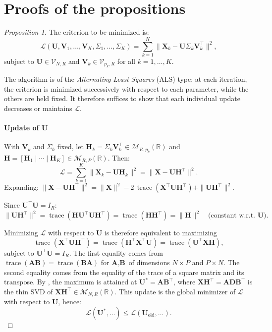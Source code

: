 \documentclass[11pt]{article}
\DeclareMathOperator{\trace}{\mathrm{trace}}
\newcommand{\X}{\mathbf{X}}
\newcommand{\U}{\mathbf{U}}
\newcommand{\V}{\mathbf{V}}
\newcommand{\HH}{\mathbf{H}}
\newcommand{\Stiefel}[2]{\mathcal V_{#1,#2}}
\begin{document}
\clearpage







\appendix
\section{Proofs of the propositions}

\begin{proof}[Proposition 1]
	The criterion to be minimized is:
\[
  \mathcal{L}(\U, \V_1, \ldots, \V_K, \Sigma_1, \ldots, \Sigma_K)
  = \sum_{k=1}^{K} \bigl\| \X_k - \U \Sigma_k \V_k^\top \bigr\|^2,
\]
subject to $\U\in\Stiefel{N}{R}$ and $\V_k\in \Stiefel{p_k}{R}$ for all $k = 1, \ldots, K$.

The algorithm is of the \emph{Alternating Least Squares} (ALS) type: at each iteration, the criterion is minimized successively with respect to each parameter, while the others are held fixed. It therefore suffices to show that each individual update decreases or maintains $\mathcal{L}$.

\paragraph{Update of $\U$} With $\V_k$ and $\Sigma_k$ fixed, let $\HH_k = \Sigma_k \V_k^\intercal \in \mathcal{M}_{R,p_k}(\mathbb{R})$ and
$\HH = [\HH_1 \mid \cdots \mid \HH_K] \in \mathcal{M}_{R,P}(\mathbb{R})$. Then:
\[
  \mathcal{L} = \sum_{k=1}^{K} \|\X_k - \U \HH_k\|^2 = \|\X - \U \HH^\intercal\|^2.
\]
Expanding:
$\|\X - \U \HH^\intercal\|^2
  = \|\X\|^2 - 2\,\operatorname{trace}(\X^\intercal \U \HH^\intercal) + \|\U \HH^\intercal\|^2.$

\noindent Since $\U^\intercal \U = I_R$: $\|\U \HH^\intercal\|^2
  = \operatorname{trace}(\HH \U^\intercal \U \HH^\intercal)
  = \operatorname{trace}(\HH \HH^\intercal)
  = \|\HH\|^2 \quad \text{(constant w.r.t.\ } \U\text{)}.$

\noindent Minimizing $\mathcal{L}$ with respect to $\U$ is therefore equivalent to
maximizing $$\trace(\X^\intercal\U\HH^\intercal)=\trace(\HH^\intercal\X^\intercal\U)=\trace(\U^\intercal\X\HH),$$
subject to $\U^\intercal \U = I_R$. The first equality comes from $\trace(\textbf{A}\textbf{B})=\trace(\textbf{B}\textbf{A})$ for $\textbf{A},\textbf{B}$ of dimensions $N\times P$ and $P\times N$. The second equality comes from the equality of the trace of a square matrix and its transpose. By \cite{cliff1966}, the maximum is attained at $\U^* = \mathbf A\mathbf B^\intercal$, where $\X\HH^\intercal=\mathbf A\mathbf D\mathbf B^\intercal$ is the thin SVD of $\X\HH^\intercal\in\mathcal M_{N,R}(\mathbb R)$.
This update is the global minimizer of $\mathcal{L}$ with respect to $\U$, hence:
\[
  \mathcal{L}(\U^*, \ldots) \leq \mathcal{L}(\U_{\mathrm{old}}, \ldots).
\]

\end{proof}
\end{document}
